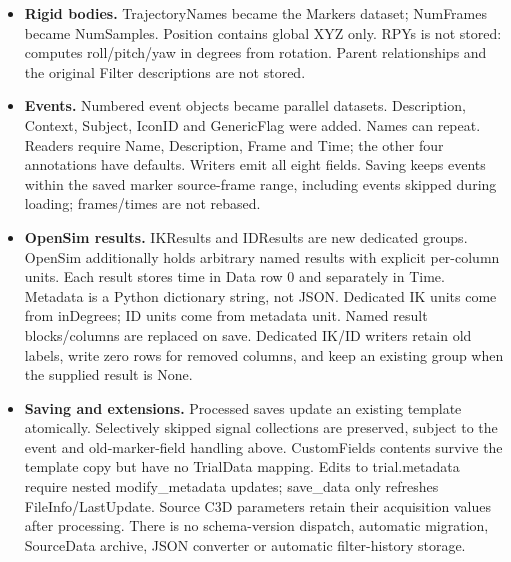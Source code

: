 \documentclass{article}
\newcommand{\code}[1]{\texttt{\detokenize{#1}}}
\begin{document}
\begin{itemize}
    \item \textbf{Rigid bodies.}
    TrajectoryNames became the Markers dataset; NumFrames became NumSamples.
    Position contains global XYZ only. RPYs is not stored:
    \code{RigidBody.RPY} computes roll/pitch/yaw in degrees from rotation.
    Parent relationships and the original Filter descriptions are not stored.

    \item \textbf{Events.}
    Numbered event objects became parallel datasets. Description, Context,
    Subject, IconID and GenericFlag were added. Names can repeat.
    Readers require Name, Description, Frame and Time; the other four
    annotations have defaults. Writers emit all eight fields.
    Saving keeps events within the saved marker source-frame range,
    including events skipped during loading; frames/times are not rebased.

    \item \textbf{OpenSim results.}
    IKResults and IDResults are new dedicated groups. OpenSim additionally
    holds arbitrary named results with explicit per-column units.
    Each result stores time in Data row 0 and separately in Time.
    Metadata is a Python dictionary string, not JSON.
    Dedicated IK units come from inDegrees; ID units come from metadata unit.
    Named result blocks/columns are replaced on save. Dedicated IK/ID writers
    retain old labels, write zero rows for removed columns, and keep an
    existing group when the supplied result is None.

    \item \textbf{Saving and extensions.}
    Processed saves update an existing template atomically.
    Selectively skipped signal collections are preserved, subject to the
    event and old-marker-field handling above.
    CustomFields contents survive the template copy but have no TrialData
    mapping. Edits to trial.metadata require nested modify\_metadata updates;
    save\_data only refreshes FileInfo/LastUpdate.
    Source C3D parameters retain their acquisition values after processing.
    There is no schema-version dispatch, automatic migration, SourceData
    archive, JSON converter or automatic filter-history storage.
\end{itemize}
\end{document}
